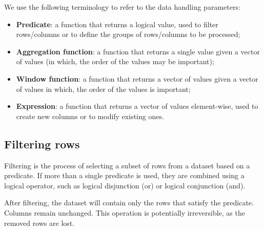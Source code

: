 \newpage

We use the following terminology to refer to the data handling parameters:
\begin{itemize}
  \item \textbf{Predicate}: a function that returns a logical value, used to filter
    rows/columns or to define the groups of rows/columns to be processed;
  \item \textbf{Aggregation function}: a function that returns a single value given a vector
    of values (in which, the order of the values may be important);
  \item \textbf{Window function}: a function that returns a vector of values given a vector
    of values in which, the order of the values is important;
  \item \textbf{Expression}: a function that returns a vector of values element-wise, used to create new
    columns or to modify existing ones.
\end{itemize}



\subsection{Filtering rows}

Filtering is the process of selecting a subset of rows from a dataset based on a
predicate.  If more than a single predicate is used, they are combined using a logical
operator, such as logical disjunction (or) or logical conjunction (and).

After filtering, the dataset will contain only the rows that satisfy the predicate.
Columns remain unchanged.  This operation is potentially irreversible, as the removed
rows are lost.

